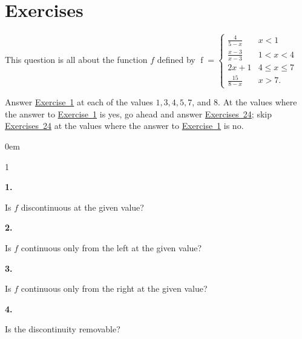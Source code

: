 \documentclass[12pt,]{book}
\newcommand{\lt}{<}
\newcommand{\gt}{>}
\theoremstyle{plain}
\theoremstyle{definition}
\numberwithin{equation}{section}
\newenvironment{exercisegroup}%
{\medskip\noindent}%
{\par\bigskip}%
\newlength{\exercisegroupindent}%
\newlength{\exercisegroupitemwidth}%
\newenvironment{exercisegrouplist}%
{\vspace{-\partopsep}%
\begin{adjustwidth}{\exercisegroupindent}{0em}}%
{\end{adjustwidth}%
\vspace{-\partopsep}%
\vspace{\baselineskip}}%
\newenvironment{exercisegroupbycol}[1]%
{\begin{exercisegrouplist}%
\vspace{-\multicolsep}%
\begin{multicols}{#1}%
\setlength{\parindent}{0em}%
\setlength{\exercisegroupitemwidth}{\linewidth}}%
{\end{multicols}%
\vspace{-\multicolsep}%
\end{exercisegrouplist}}%
\newenvironment{exercisegroupitem}[1]%
{\begin{minipage}[t]{\exercisegroupitemwidth}
\vspace{0pt}%
{\bfseries#1}%
\rule{0pt}{\baselineskip}}{\strut%
\end{minipage}%
\hspace{\columnsep}}%
\providecommand\phantomsection{}
\newcommand{\fe}[2]{\mathop{{#1}{\left(#2\right)}}}
\begin{document}
\section*{Exercises}\label{exercises-17}

\begin{exercisegroup}%
This question is all about the function \(f\) defined by \(\fe{f}{x}=\begin{cases}\frac{4}{5-x}&x\lt1\\\frac{x-3}{x-3}&1\lt x\lt4\\2x+1&4\leq x\leq7\\\frac{15}{8-x}&x\gt7\text{.}\end{cases}\)%
\par
Answer \hyperref[exercise-first-piecewise]{Exercise~1} at each of the values \(1,3,4,5,7\), and \(8\). At the values where the answer to \hyperref[exercise-first-piecewise]{Exercise~1} is yes, go ahead and answer \hyperref[exercise-second-piecewise]{Exercises~2}\textendash{}\hyperref[exercise-last-piecewise]{4}; skip \hyperref[exercise-second-piecewise]{Exercises~2}\textendash{}\hyperref[exercise-last-piecewise]{4} at the values where the answer to \hyperref[exercise-first-piecewise]{Exercise~1} is no.%
\par
\begin{exercisegroupbycol}{1}%
\begin{exercisegroupitem}{1. }\phantomsection\hypertarget{exercise-first-piecewise}{\null}
Is \(f\) discontinuous at the given value?%
\end{exercisegroupitem}%
\par%
\begin{exercisegroupitem}{2. }\phantomsection\hypertarget{exercise-second-piecewise}{\null}
Is \(f\) continuous only from the left at the given value?%
\end{exercisegroupitem}%
\par%
\begin{exercisegroupitem}{3. }\phantomsection\hypertarget{exercise-130}{\null}
Is \(f\) continuous only from the right at the given value?%
\end{exercisegroupitem}%
\par%
\begin{exercisegroupitem}{4. }\phantomsection\hypertarget{exercise-last-piecewise}{\null}
Is the discontinuity removable?%
\end{exercisegroupitem}%
\par%
\end{exercisegroupbycol}%
\end{exercisegroup}%
\end{document}
